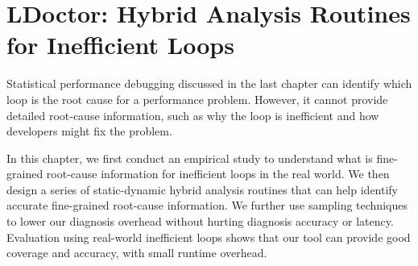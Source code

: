 \chapter[LDoctor: Hybrid Analysis Routines for Inefficient Loops]{LDoctor: Hybrid Analysis Routines for Inefficient Loops}
\label{chap:ldoctor}

Statistical performance debugging discussed in the last chapter can 
identify which loop is the root cause for a performance problem. 
However, it cannot provide detailed root-cause information, 
such as why the loop is inefficient and how developers might fix the problem. 

In this chapter, we first conduct an empirical study to understand what is
fine-grained root-cause information for inefficient loops in the real world. 
We then design a series of static-dynamic hybrid analysis routines that can
help identify accurate fine-grained root-cause information.
We further use sampling techniques to lower our diagnosis overhead without
hurting diagnosis accuracy or latency. Evaluation using real-world inefficient loops 
shows that our tool can provide good coverage and accuracy, 
with small runtime overhead.







